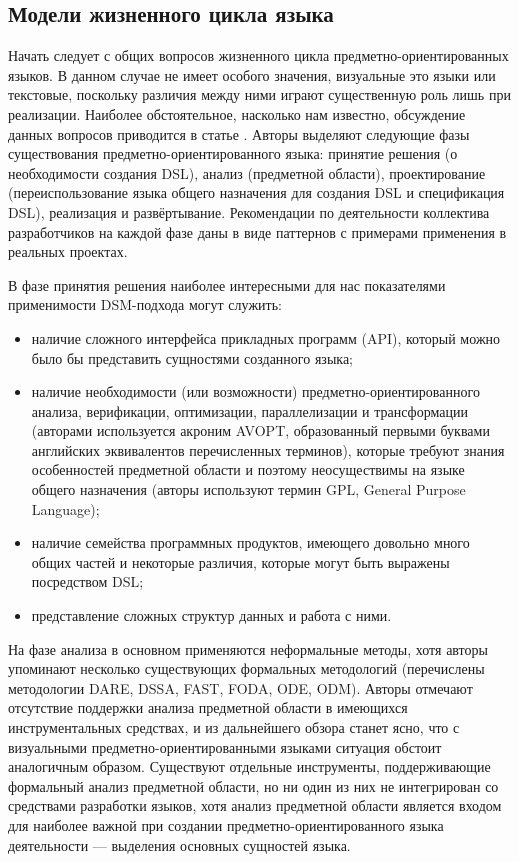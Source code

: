 \subsection{Модели жизненного цикла языка}
Начать следует с общих вопросов жизненного цикла предметно-ориентированных языков.
В данном случае не имеет особого значения, визуальные это языки или текстовые, поскольку
различия между ними играют существенную роль лишь при реализации. Наиболее обстоятельное,
насколько нам известно, обсуждение данных вопросов приводится в статье \cite{mernik2005and}. 
Авторы выделяют следующие фазы существования предметно-ориентированного языка: принятие 
решения (о необходимости создания DSL), анализ (предметной области), проектирование 
(переиспользование языка общего назначения для создания DSL и спецификация DSL), реализация 
и развёртывание. Рекомендации по деятельности коллектива разработчиков на каждой фазе 
даны в виде паттернов с примерами применения в реальных проектах. 

В фазе принятия решения наиболее интересными для нас показателями применимости DSM-подхода могут служить: 
\begin{itemize}
	\item наличие сложного интерфейса прикладных программ (API), который можно было 
		бы представить сущностями созданного языка;
	\item наличие необходимости (или возможности) предметно-ориентированного анализа, 
		верификации, оптимизации, параллелизации и трансформации (авторами используется 
		акроним AVOPT, образованный первыми буквами английских эквивалентов перечисленных 
		терминов), которые требуют знания особенностей предметной области и поэтому неосуществимы 
		на языке общего назначения (авторы используют термин GPL, General Purpose Language);
	\item наличие семейства программных продуктов, имеющего довольно много общих частей 
		и некоторые различия, которые могут быть выражены посредством DSL;
	\item представление сложных структур данных и работа с ними.
\end{itemize}

На фазе анализа в основном применяются неформальные методы, хотя авторы упоминают 
несколько существующих формальных методологий (перечислены методологии
DARE, DSSA, FAST, FODA, ODE, ODM). Авторы отмечают отсутствие поддержки анализа предметной 
области в имеющихся инструментальных средствах, и из дальнейшего обзора станет ясно, 
что с визуальными предметно-ориентированными языками ситуация обстоит аналогичным 
образом. Существуют отдельные инструменты, поддерживающие формальный анализ предметной 
области, но ни один из них не интегрирован со средствами разработки языков, хотя анализ 
предметной области является входом для наиболее важной при создании предметно-ориентированного 
языка деятельности –-- выделения основных сущностей языка.

